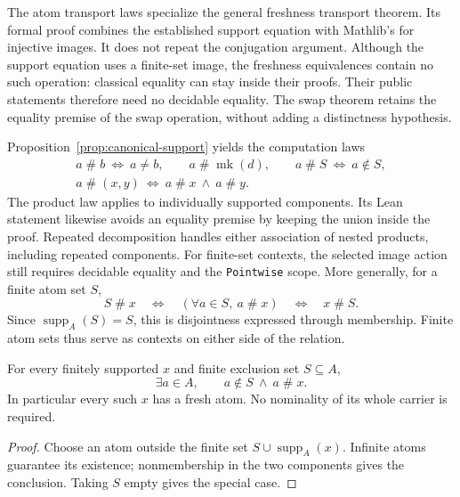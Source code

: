 The atom transport laws specialize the general freshness transport theorem.
Its formal proof combines the established support equation with Mathlib's
 for injective images. It does not repeat the
conjugation argument. Although the support equation uses a finite-set
image, the freshness equivalences contain no such operation: classical
equality can stay inside their proofs. Their public statements therefore
need no decidable equality. The swap theorem retains the equality premise
of the swap operation, without adding a distinctness hypothesis.

Proposition~\ref{prop:canonical-support} yields the computation laws
\begin{gather*}
  a\mathrel{\#}b\ \Longleftrightarrow\ a\ne b,\qquad
  a\mathrel{\#}\operatorname{mk}(d),\qquad
  a\mathrel{\#}S\ \Longleftrightarrow\ a\notin S,\\
  a\mathrel{\#}(x,y)\ \Longleftrightarrow\
    a\mathrel{\#}x\ \land\ a\mathrel{\#}y.
\end{gather*}
The product law applies to individually supported components. Its Lean
statement likewise avoids an equality premise by keeping the union inside
the proof. Repeated decomposition handles either association of nested
products, including repeated components. For finite-set contexts, the
selected image action still requires decidable equality and the
\texttt{Pointwise} scope.
More generally, for a finite atom set $S$,
\[
 S\mathrel{\#}x\quad\Longleftrightarrow\quad
 (\forall a\in S,\ a\mathrel{\#}x)
 \quad\Longleftrightarrow\quad x\mathrel{\#}S.
\]
Since $\operatorname{supp}_A(S)=S$, this is disjointness expressed through
membership. Finite atom sets thus serve as contexts on either side of the relation.

\begin{proposition}
\label{prop:fresh-existence}
For every finitely supported $x$ and finite exclusion set $S\subseteq A$,
\[
  \exists a\in A,\qquad a\notin S\ \land\ a\mathrel{\#}x.
\]
In particular every such $x$ has a fresh atom. No nominality of its whole
carrier is required.
\end{proposition}

\begin{proof}
Choose an atom outside the finite set
$S\cup\operatorname{supp}_A(x)$. Infinite atoms guarantee its existence;
nonmembership in the two components gives the conclusion. Taking $S$ empty
gives the special case.
\end{proof}

